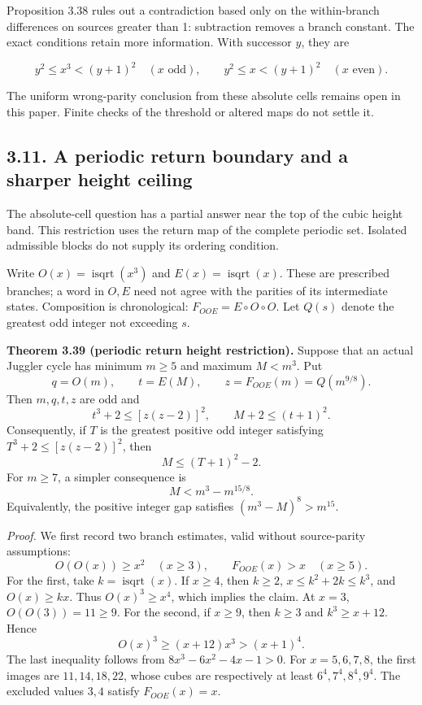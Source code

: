 \documentclass[12pt]{article}
\begin{document}
Proposition 3.38 rules out a contradiction based only on the
within-branch differences on sources greater than 1: subtraction removes
a branch constant. The exact conditions retain more information. With
successor \(y\), they are

\[
y^2\le x^3<(y+1)^2\quad(x\text{ odd}),\qquad
y^2\le x<(y+1)^2\quad(x\text{ even}).
\]

The uniform wrong-parity conclusion from these absolute cells remains
open in this paper. Finite checks of the threshold or altered maps do
not settle it.

\subsection{3.11. A periodic return boundary and a sharper height
ceiling}\label{a-periodic-return-boundary-and-a-sharper-height-ceiling}

The absolute-cell question has a partial answer near the top of the
cubic height band. This restriction uses the return map of the complete
periodic set. Isolated admissible blocks do not supply its ordering
condition.

Write \(O(x)=\operatorname{isqrt}(x^3)\) and
\(E(x)=\operatorname{isqrt}(x)\). These are prescribed branches; a word
in \(O,E\) need not agree with the parities of its intermediate states.
Composition is chronological: \(F_{OOE}=E\circ O\circ O\). Let \(Q(s)\)
denote the greatest odd integer not exceeding \(s\).

\textbf{Theorem 3.39 (periodic return height restriction).} Suppose that
an actual Juggler cycle has minimum \(m\ge5\) and maximum \(M<m^3\). Put
\[
q=O(m),\qquad t=E(M),\qquad z=F_{OOE}(m)=Q(m^{9/8}).
\] Then \(m,q,t,z\) are odd and \[
t^3+2\le[z(z-2)]^2,\qquad M+2\le(t+1)^2. \tag{RC1}
\] Consequently, if \(T\) is the greatest positive odd integer
satisfying \(T^3+2\le[z(z-2)]^2\), then \[
M\le(T+1)^2-2. \tag{RC2}
\] For \(m\ge7\), a simpler consequence is \[
\boxed{M<m^3-m^{15/8}.} \tag{RC3}
\] Equivalently, the positive integer gap satisfies
\((m^3-M)^8>m^{15}\).

\emph{Proof.} We first record two branch estimates, valid without
source-parity assumptions: \[
O(O(x))\ge x^2\quad(x\ge3),\qquad
F_{OOE}(x)>x\quad(x\ge5). \tag{RC4}
\] For the first, take \(k=\operatorname{isqrt}(x)\). If \(x\ge4\), then
\(k\ge2\), \(x\le k^2+2k\le k^3\), and \(O(x)\ge kx\). Thus
\(O(x)^3\ge x^4\), which implies the claim. At \(x=3\),
\(O(O(3))=11\ge9\). For the second, if \(x\ge9\), then \(k\ge3\) and
\(k^3\ge x+12\). Hence \[
O(x)^3\ge(x+12)x^3>(x+1)^4.
\] The last inequality follows from \(8x^3-6x^2-4x-1>0\). For
\(x=5,6,7,8\), the first images are \(11,14,18,22\), whose cubes are
respectively at least \(6^4,7^4,8^4,9^4\). The excluded values \(3,4\)
satisfy \(F_{OOE}(x)=x\).
\end{document}
